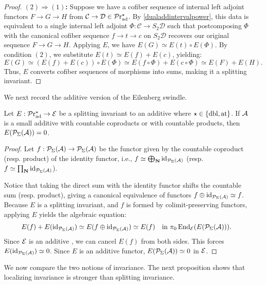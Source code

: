 \documentclass[a4paper,10pt, oneside]{amsart}
\begin{document}
\begin{proof}
		\textbf{$(2) \Rightarrow (1)$:} Suppose we have a cofiber sequence of internal left adjoint functors $F \to G \to H$ from $\mathcal{C} \to \mathcal{D}\in \mathcal{P}\mathrm{r}_{\mathrm{ad}}^\star$. By \cref{dualaddintervalpower}, this data is equivalent to a single internal left adjoint $\Phi: \mathcal{C} \to S_2 \mathcal{D}$ such that postcomposing $\Phi$ with the canonical cofiber sequence $f \to t \to c$ on $S_2 \mathcal{D}$ recovers our original sequence $F \to G \to H$. Applying $E$, we have $E(G) \simeq E(t) \circ E(\Phi)$. By condition $(2)$, we substitute $E(t) \simeq E(f) + E(c)$, yielding:
		$$ E(G) \simeq (E(f) + E(c)) \circ E(\Phi) \simeq E(f \circ \Phi) + E(c \circ \Phi) \simeq E(F) + E(H). $$
		Thus, $E$ converts cofiber sequences of morphisms into sums, making it a splitting invariant.
	\end{proof}
	We next record the additive version of the Eilenberg swindle.
	\begin{prop}\label{swindle}
			Let $E: \mathcal{P}\mathrm{r}_{\mathrm{ad}}^\star\to\mathcal{E}$ be a splitting invariant to an additive \infcat where $\star \in \{ \mathrm{dbl}, \mathrm{at} \}$. If $\mathcal{A}$ is a small additive \infcat with countable coproducts or with countable  products, then $E(\mathcal{P}_\Sigma(\mathcal{A}))=0$.
	\end{prop}
	\begin{proof}
 Let $f: \mathcal{P}_\Sigma(\mathcal{A}) \to \mathcal{P}_\Sigma(\mathcal{A})$ be the functor given by the countable coproduct (resp. product) of the identity functor, i.e., $f \simeq \bigoplus_{\mathbf{N}} \operatorname{id}_{\mathcal{P}_\Sigma(\mathcal{A})}$ (resp. $f \simeq \prod_{\mathbf{N}} \operatorname{id}_{\mathcal{P}_\Sigma(\mathcal{A})}$). 
		
		Notice that taking the direct sum with the identity functor shifts the countable sum (resp. product), giving a canonical equivalence of functors $f \oplus \operatorname{id}_{\mathcal{P}_\Sigma(\mathcal{A})} \simeq f$. Because $E$ is a splitting invariant, and $f$ is formed by colimit-preserving functors, applying $E$ yields the algebraic equation:
		$$ E(f) + E(\operatorname{id}_{\mathcal{P}_\Sigma(\mathcal{A})}) \simeq E(f \oplus \operatorname{id}_{\mathcal{P}_\Sigma(\mathcal{A})}) \simeq E(f) \quad \text{in } \pi_0\operatorname{End}_{\mathcal{E}}(E(\mathcal{P}_\Sigma(\mathcal{A}))). $$
		Since $\mathcal{E}$ is an  additive \infcat, we can cancel $E(f)$ from both sides. This forces $E(\operatorname{id}_{\mathcal{P}_\Sigma(\mathcal{A})}) \simeq 0$. Since $E$ is an additive functor, $E(\mathcal{P}_\Sigma(\mathcal{A})) \simeq 0$ in $\mathcal{E}$.
	\end{proof}
	We now compare the two notions of invariance. The next proposition shows that localizing invariance is stronger than splitting invariance.
\end{document}
